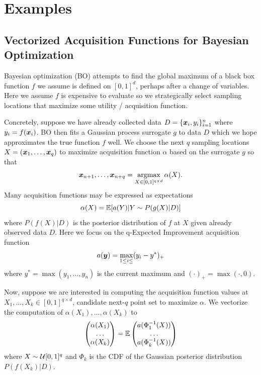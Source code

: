 \documentclass{article}[12pt]
\begin{document}
\section{Examples}

\subsection{Vectorized Acquisition Functions for Bayesian Optimization}

Bayesian optimization (BO) attempts to find the global maximum of a black box function $f$ we assume is defined on $[0,1]^d$, perhaps after a change of variables. Here we assume $f$ is expensive to evaluate so we strategically select sampling locations that maximize some utility / acquisition function. 

Concretely, suppose we have already collected data $D=\{\boldsymbol{x}_i,y_i\}_{i=1}^n$ where $y_i = f(\boldsymbol{x}_i)$. BO then fits a Gaussian process surrogate $g$ to data $D$ which we hope approximates the true function $f$ well. We choose the next $q$ sampling locations $X= (\boldsymbol{x}_1,\dots,\boldsymbol{x}_q)$ to maximize acquisition function $\alpha$ based on the surrogate $g$ so that 
$$\boldsymbol{x}_{n+1},\dots,\boldsymbol{x}_{n+q} = \operatorname*{argmax}_{X \in [0,1]^{q \times d}}\alpha(X).$$
Many acquisition functions may be expressed as expectations
$$\alpha(X) = \mathbb{E}[a(Y) | Y \sim P(g(X)|D)]$$ %
where $P(f(X)|D)$ is the posterior distribution of $f$ at $X$ given already observed data $D$. Here we focus on the q-Expected Improvement acquisition function
$$a(\boldsymbol{y}) = \max_{1 \leq i \leq} (y_i - y^*)_+$$
where $y^*= \max(y_1,\dots,y_n)$ is the current maximum and $(\cdot)_+ = \max(\cdot,0)$. 

Now, suppose we are interested in computing the acquisition function values at $X_1,\dots,X_k \in [0,1]^{q \times d}$, candidate next-$q$ point set to maximize $\alpha$. We vectorize the computation of $\alpha(X_1),\dots,\alpha(X_k)$ to
\begin{equation}
    \begin{pmatrix} \alpha(X_1) \\ \dots \\ \alpha(X_k)\end{pmatrix} = \mathbb{E}\begin{pmatrix}a(\Phi_1^{-1}(X)) \\ \dots \\ a(\Phi_k^{-1}(X))\end{pmatrix}
    \label{eq:qei_vec}
\end{equation}
where $X \sim \mathcal{U}[0,1]^q$ and $\Phi_k$ is the CDF of the Gaussian posterior distribution $P(f(X_k)|D)$. 
\end{document}
